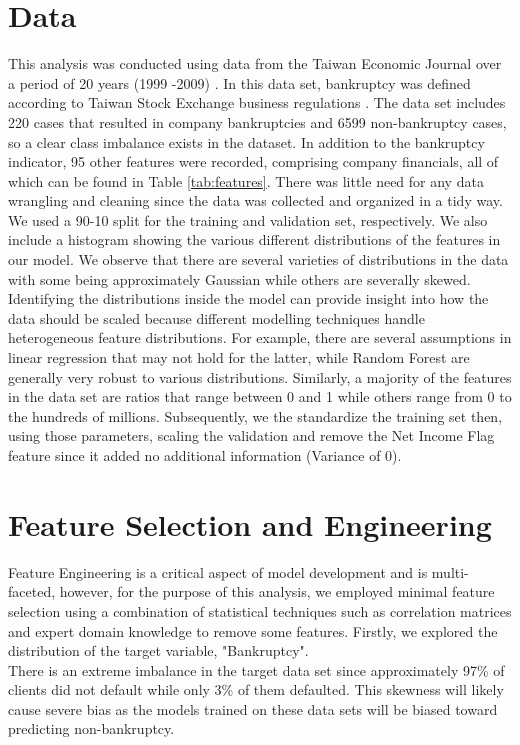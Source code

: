 \documentclass[12pt]{report}
\begin{document}
\section{Data}
This analysis was conducted using data from the Taiwan Economic Journal over a period of 20 years (1999 -2009) \cite{Data}. In this data set, bankruptcy was defined according to Taiwan Stock Exchange business regulations \cite{TSE}. The data set includes 220 cases that resulted in company bankruptcies and 6599 non-bankruptcy cases, so a clear class imbalance exists in the dataset. In addition to the bankruptcy indicator, 95 other features were recorded, comprising company financials, all of which can be found in Table \ref{tab:features}. There was little need for any data wrangling and cleaning since the data was collected and organized in a tidy way.  We used a 90-10 split for the training and validation set, respectively. We also include a histogram showing the various different distributions of the features in our model. We observe that there are several varieties of distributions in the data with some being approximately Gaussian while others are severally skewed. Identifying the distributions inside the model can provide insight into how the data should be scaled because different modelling techniques handle heterogeneous feature distributions. For example, there are several assumptions in linear regression that may not hold for the latter, while Random Forest are generally very robust to various distributions. Similarly, a majority of the features in the data set are ratios that range between 0 and 1 while others range from 0 to the hundreds of millions. Subsequently, we the standardize the training set then, using those parameters, scaling the validation and remove the Net Income Flag feature since it added no additional information (Variance of 0).

\section{Feature Selection and Engineering} 

Feature Engineering is a critical aspect of model development and is multi-faceted, however, for the purpose of this analysis, we employed minimal feature selection using a combination of statistical techniques such as correlation matrices and expert domain knowledge to remove some features. Firstly, we explored the distribution of the target variable, "Bankruptcy". \\%
\indent There is an extreme imbalance in the target data set since approximately 97\% of clients did not default while only 3\% of them defaulted. This skewness will likely cause severe bias as the models trained on these data sets will be biased toward predicting non-bankruptcy.
\end{document}
